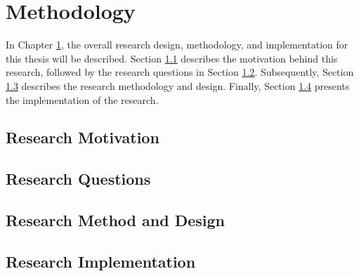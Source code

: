 \chapter{Methodology} \label{chap:method}
In Chapter \ref{chap:method}, the overall research design, methodology, and implementation for this thesis will be described. Section \ref{sec:motivation} describes the motivation behind this research, followed by the research questions in Section \ref{sec:questions}. Subsequently, Section \ref{sec:method} describes the research methodology and design. Finally, Section \ref{sec:implementation} presents the implementation of the research.

\section{Research Motivation} \label{sec:motivation}


\section{Research Questions} \label{sec:questions}

\section{Research Method and Design} \label{sec:method}

\section{Research Implementation} \label{sec:implementation}